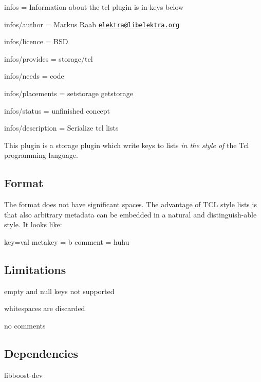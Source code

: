
\begin{DoxyItemize}
\item infos = Information about the tcl plugin is in keys below
\item infos/author = Markus Raab \href{mailto:elektra@libelektra.org}{\tt elektra@libelektra.\+org}
\item infos/licence = B\+S\+D
\item infos/provides = storage/tcl
\item infos/needs = code
\item infos/placements = setstorage getstorage
\item infos/status = unfinished concept
\item infos/description = Serialize tcl lists
\end{DoxyItemize}

This plugin is a storage plugin which write keys to lists {\itshape in the style of} the Tcl programming language.

\subsection*{Format}

The format does not have significant spaces. The advantage of T\+C\+L style lists is that also arbitrary metadata can be embedded in a natural and distinguish-\/able style. It looks like\+: \begin{DoxyVerb}{
    {
        key=val
        {
            metakey = b
        }
        {
            comment = huhu
        }
    }
}
\end{DoxyVerb}


\subsection*{Limitations}


\begin{DoxyItemize}
\item empty and null keys not supported
\item whitespaces are discarded
\item no comments
\end{DoxyItemize}

\subsection*{Dependencies}


\begin{DoxyItemize}
\item {\ttfamily libboost-\/dev} 
\end{DoxyItemize}